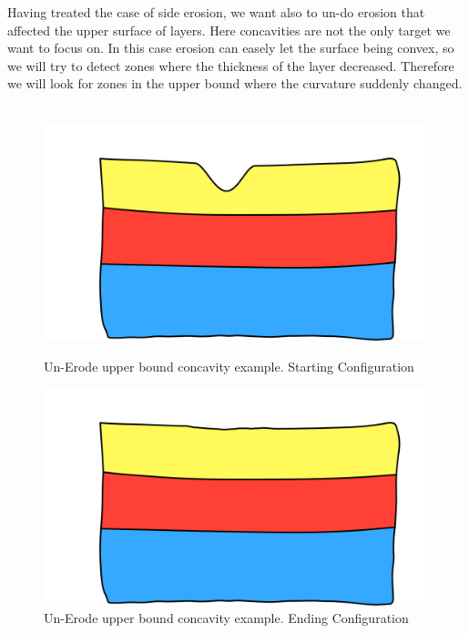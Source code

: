 \documentclass[12pt, a4paper]{memoir} %
\begin{document}
Having treated the case of side erosion, we want also to un-do erosion that affected the upper surface of layers. Here concavities are not the only target we want to focus on. In this case erosion can easely let the surface being convex, so we will try to detect zones where the thickness of the layer decreased. Therefore we will look for zones in the upper bound where the curvature suddenly changed.\\\\
\begin{figure}[h]
    \begin{minipage}[c]{.46\linewidth}
        \centering
        \includegraphics[scale=0.2]{unErodeUpDescription0.png}
	\caption{Un-Erode upper bound concavity example. Starting Configuration}
    \end{minipage}
    \hfill%
    \begin{minipage}[c]{.46\linewidth}
        \centering
        \includegraphics[scale=0.2]{unErodeUpDescription1.png}
	\caption{Un-Erode upper bound concavity example. Ending Configuration}
    \end{minipage}
\end{figure}\\
\end{document}
